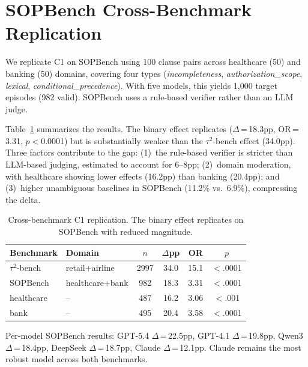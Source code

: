 \documentclass[11pt,a4paper]{article}
\begin{document}
\appendix

\section{SOPBench Cross-Benchmark Replication}
\label{app:sopbench}

We replicate C1 on SOPBench \cite{li2025sopbench} using 100 clause pairs across healthcare (50) and banking (50) domains, covering four types (\emph{incompleteness}, \emph{authorization\_scope}, \emph{lexical}, \emph{conditional\_precedence}).
With five models, this yields 1{,}000 target episodes (982 valid).
SOPBench uses a rule-based verifier rather than an LLM judge.

Table~\ref{tab:sopbench_c1} summarizes the results.
The binary effect replicates ($\Delta$\,=\,18.3pp, OR\,=\,3.31, $p<$0.0001) but is substantially weaker than the $\tau^2$-bench effect (34.0pp).
Three factors contribute to the gap: (1)~the rule-based verifier is stricter than LLM-based judging, estimated to account for 6--8pp; (2)~domain moderation, with healthcare showing lower effects (16.2pp) than banking (20.4pp); and (3)~higher unambiguous baselines in SOPBench (11.2\% vs.\ 6.9\%), compressing the delta.

\begin{table}[t]
\centering
\small
\begin{tabular}{llcccc}
\toprule
\textbf{Benchmark} & \textbf{Domain} & \textbf{$n$} & \textbf{$\Delta$pp} & \textbf{OR} & \textbf{$p$} \\
\midrule
$\tau^2$-bench & retail+airline & 2997 & 34.0 & 15.1 & $<$.0001 \\
SOPBench & healthcare+bank & 982 & 18.3 & 3.31 & $<$.0001 \\
\quad healthcare & -- & 487 & 16.2 & 3.06 & $<$.001 \\
\quad bank & -- & 495 & 20.4 & 3.58 & $<$.0001 \\
\bottomrule
\end{tabular}
\caption{Cross-benchmark C1 replication. The binary effect replicates on SOPBench with reduced magnitude.}
\label{tab:sopbench_c1}
\end{table}

Per-model SOPBench results: GPT-5.4 $\Delta$\,=\,22.5pp, GPT-4.1 $\Delta$\,=\,19.8pp, Qwen3 $\Delta$\,=\,18.4pp, DeepSeek $\Delta$\,=\,18.7pp, Claude $\Delta$\,=\,12.1pp.
Claude remains the most robust model across both benchmarks.
\end{document}
